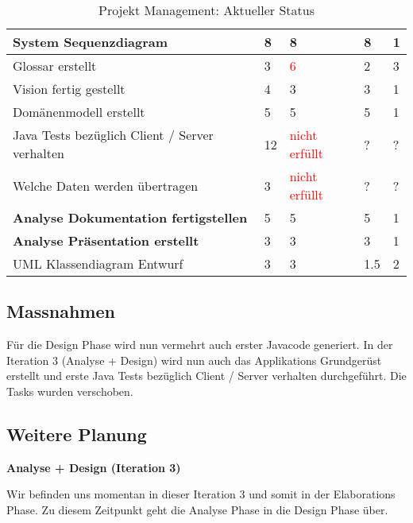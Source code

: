 \begin{table}[htp]
\begin{tabular}{ | p{6.5cm} | l  | l | l | l |}
System Sequenzdiagram & 8  & 8 & 8 & 1 \\ \hline
Glossar erstellt & 3  & \textcolor{red}{6} & 2 & 3 \\ \hline
Vision fertig gestellt & 4 & 3 & 3 & 1 \\ \hline
Domänenmodell erstellt & 5  & 5 & 5 & 1 \\ \hline
Java Tests bezüglich Client / Server verhalten & 12 & \textcolor{red}{nicht erfüllt} & ? & ? \\ \hline
Welche Daten werden übertragen & 3 & \textcolor{red}{nicht erfüllt} & ? & ? \\ \hline
\textbf{Analyse Dokumentation fertigstellen} & 5 & 5 & 5 & 1 \\ \hline
\textbf{Analyse Präsentation erstellt} & 3 & 3 & 3 & 1 \\ \hline
UML Klassendiagram Entwurf & 3 & 3 & 1.5 & 2 \\ \hline
\end{tabular}
\caption{Projekt Management: Aktueller Status}
\end{table}

\subsection{Massnahmen} \label{sec:Massnahmen}
Für die Design Phase wird nun vermehrt auch erster Javacode generiert. In der Iteration 3 (Analyse + Design) 
wird nun auch das Applikations Grundgerüst erstellt und erste Java Tests bezüglich Client / Server verhalten durchgeführt. Die Tasks wurden verschoben.

\subsection{Weitere Planung} \label{sec:Weitere-Planung}

\textbf{Analyse + Design (Iteration 3)}

Wir befinden uns momentan in dieser Iteration 3 und somit in der Elaborations Phase. Zu diesem Zeitpunkt geht die Analyse Phase in die Design Phase über.


